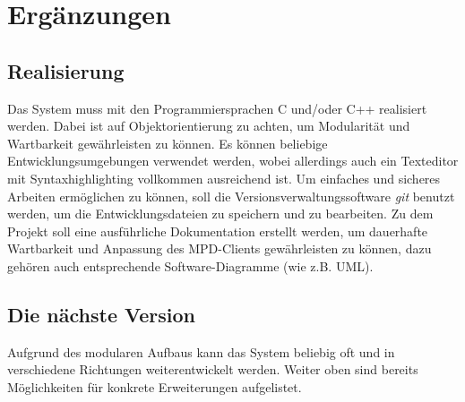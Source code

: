 \section{Ergänzungen}
\subsection{Realisierung}
Das System muss mit den Programmiersprachen C und/oder C++ realisiert werden. Dabei ist auf
Objektorientierung zu achten, um Modularität und Wartbarkeit gewährleisten zu können.
Es können beliebige Entwicklungsumgebungen verwendet werden, wobei allerdings auch ein Texteditor mit Syntaxhighlighting vollkommen ausreichend ist.
Um einfaches und sicheres Arbeiten ermöglichen zu können, soll die Versionsverwaltungssoftware \emph{git} benutzt werden, um die
Entwicklungsdateien zu speichern und zu bearbeiten. Zu dem Projekt soll eine ausführliche
Dokumentation erstellt werden, um dauerhafte Wartbarkeit und Anpassung des MPD-Clients gewährleisten
zu können, dazu gehören auch entsprechende Software-Diagramme (wie z.B. UML).
\subsection{Die nächste Version}
Aufgrund des modularen Aufbaus kann das System beliebig oft und in verschiedene Richtungen weiterentwickelt werden.
Weiter oben sind bereits Möglichkeiten für konkrete Erweiterungen aufgelistet.
